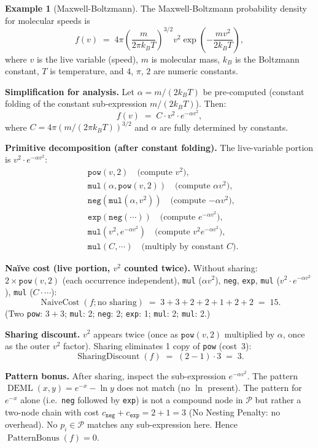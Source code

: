 \documentclass[12pt,a4paper]{article}
\theoremstyle{definition}
\newtheorem{example}[theorem]{Example}
\newcommand{\DEML}{\operatorname{DEML}}
\newcommand{\NC}{\operatorname{NaiveCost}}
\newcommand{\SD}{\operatorname{SharingDiscount}}
\newcommand{\PB}{\operatorname{PatternBonus}}
\begin{document}
\begin{example}[Maxwell-Boltzmann]
\label{ex:MB}
The Maxwell-Boltzmann probability density for molecular speeds is
\[
  f(v) \;=\; 4\pi \left(\frac{m}{2\pi k_B T}\right)^{3/2}
             v^2 \exp\!\left(-\frac{mv^2}{2k_BT}\right),
\]
where $v$ is the live variable (speed), $m$ is molecular mass, $k_B$ is the
Boltzmann constant, $T$ is temperature, and $4$, $\pi$, $2$ are numeric
constants.

\textbf{Simplification for analysis.}
Let $\alpha = m/(2k_BT)$ be pre-computed (constant folding of the constant
sub-expression $m/(2k_BT)$).  Then:
\[
  f(v) \;=\; C \cdot v^2 \cdot e^{-\alpha v^2},
\]
where $C = 4\pi(m/(2\pi k_BT))^{3/2}$ and $\alpha$ are fully determined by
constants.

\textbf{Primitive decomposition (after constant folding).}
The live-variable portion is $v^2 \cdot e^{-\alpha v^2}$:
\begin{align*}
  &\texttt{pow}(v, 2) \quad\text{(compute $v^2$)},\\
  &\texttt{mul}(\alpha, \texttt{pow}(v,2)) \quad\text{(compute $\alpha v^2$)},\\
  &\texttt{neg}(\texttt{mul}(\alpha, v^2)) \quad\text{(compute $-\alpha v^2$)},\\
  &\texttt{exp}(\texttt{neg}(\cdots)) \quad\text{(compute $e^{-\alpha v^2}$)},\\
  &\texttt{mul}(v^2, e^{-\alpha v^2}) \quad\text{(compute $v^2 e^{-\alpha v^2}$)},\\
  &\texttt{mul}(C, \cdots) \quad\text{(multiply by constant $C$)}.
\end{align*}

\textbf{Na\"{i}ve cost (live portion, $v^2$ counted twice).}
Without sharing: $2 \times \texttt{pow}(v,2)$ (each occurrence independent),
\texttt{mul} ($\alpha v^2$), \texttt{neg}, \texttt{exp}, \texttt{mul}
($v^2 \cdot e^{-\alpha v^2}$), \texttt{mul} ($C \cdot \cdots$):
\[
  \NC(f; \text{no sharing}) \;=\; 3 + 3 + 2 + 2 + 1 + 2 + 2 \;=\; 15.
\]
(Two \texttt{pow}: $3+3$; \texttt{mul}: 2; \texttt{neg}: 2; \texttt{exp}: 1;
\texttt{mul}: 2; \texttt{mul}: 2.)

\textbf{Sharing discount.}
$v^2$ appears twice (once as $\texttt{pow}(v,2)$ multiplied by $\alpha$, once
as the outer $v^2$ factor).  Sharing eliminates 1 copy of \texttt{pow}
(cost~3):
\[
  \SD(f) \;=\; (2-1) \cdot 3 \;=\; 3.
\]

\textbf{Pattern bonus.}
After sharing, inspect the sub-expression $e^{-\alpha v^2}$.  The pattern
$\DEML(x,y) = e^{-x} - \ln y$ does not match (no $\ln$ present).  The
pattern for $e^{-x}$ alone (i.e.\ \texttt{neg} followed by \texttt{exp}) is
not a compound node in $\mathcal{P}$ but rather a two-node chain with cost
$c_{\texttt{neg}} + c_{\texttt{exp}} = 2 + 1 = 3$ (No Nesting Penalty: no
overhead).  No $p_i \in \mathcal{P}$ matches any sub-expression here.
Hence $\PB(f) = 0$.


\end{example}
\end{document}
